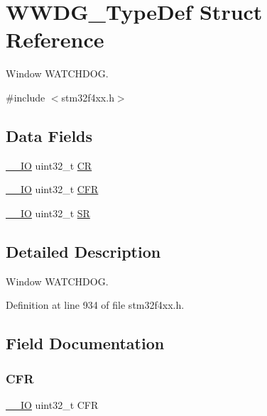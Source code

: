 \hypertarget{struct_w_w_d_g___type_def}{}\section{W\+W\+D\+G\+\_\+\+Type\+Def Struct Reference}
\label{struct_w_w_d_g___type_def}


Window W\+A\+T\+C\+H\+D\+OG.  




{\ttfamily \#include $<$stm32f4xx.\+h$>$}

\subsection*{Data Fields}
\begin{DoxyCompactItemize}
\item 
\hyperlink{group___c_m_s_i_s__core__definitions_gaec43007d9998a0a0e01faede4133d6be}{\+\_\+\+\_\+\+IO} uint32\+\_\+t \hyperlink{struct_w_w_d_g___type_def_ab40c89c59391aaa9d9a8ec011dd0907a}{CR}
\item 
\hyperlink{group___c_m_s_i_s__core__definitions_gaec43007d9998a0a0e01faede4133d6be}{\+\_\+\+\_\+\+IO} uint32\+\_\+t \hyperlink{struct_w_w_d_g___type_def_ac011ddcfe531f8e16787ea851c1f3667}{C\+FR}
\item 
\hyperlink{group___c_m_s_i_s__core__definitions_gaec43007d9998a0a0e01faede4133d6be}{\+\_\+\+\_\+\+IO} uint32\+\_\+t \hyperlink{struct_w_w_d_g___type_def_af6aca2bbd40c0fb6df7c3aebe224a360}{SR}
\end{DoxyCompactItemize}


\subsection{Detailed Description}
Window W\+A\+T\+C\+H\+D\+OG. 

Definition at line 934 of file stm32f4xx.\+h.



\subsection{Field Documentation}
\mbox{\label{struct_w_w_d_g___type_def_ac011ddcfe531f8e16787ea851c1f3667}} 
\subsubsection{\texorpdfstring{C\+FR}{CFR}}
{\footnotesize\ttfamily \hyperlink{group___c_m_s_i_s__core__definitions_gaec43007d9998a0a0e01faede4133d6be}{\+\_\+\+\_\+\+IO} uint32\+\_\+t C\+FR}

